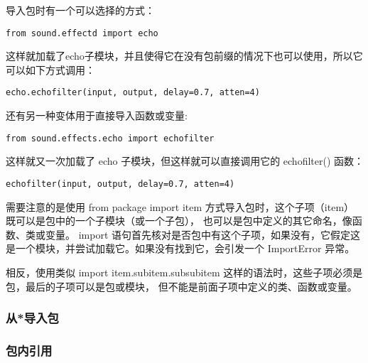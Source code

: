 \documentclass[UTF8]{ctexart}
\begin{document}
导入包时有一个可以选择的方式：
\begin{verbatim}
from sound.effectd import echo
\end{verbatim}

这样就加载了echo子模块，并且使得它在没有包前缀的情况下也可以使用，所以它可以如下方式调用：
\begin{verbatim}
echo.echofilter(input, output, delay=0.7, atten=4)
\end{verbatim}

还有另一种变体用于直接导入函数或变量:
\begin{verbatim}
from sound.effects.echo import echofilter
\end{verbatim}

这样就又一次加载了 echo 子模块，但这样就可以直接调用它的 echofilter() 函数：
\begin{verbatim}
echofilter(input, output, delay=0.7, atten=4)
\end{verbatim}

需要注意的是使用 from package import item 方式导入包时，这个子项（item）既可以是包中的一个子模块（或一个子包），
也可以是包中定义的其它命名，像函数、类或变量。
import 语句首先核对是否包中有这个子项，如果没有，它假定这是一个模块，并尝试加载它。如果没有找到它，会引发一个 ImportError 异常。

相反，使用类似 import item.subitem.subsubitem 这样的语法时，这些子项必须是包，最后的子项可以是包或模块，
但不能是前面子项中定义的类、函数或变量。

\subsubsection{从*导入包}
\subsubsection{包内引用}
\end{document}
